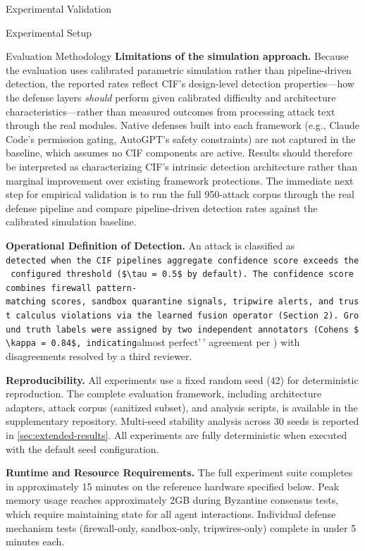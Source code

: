 \documentclass[
  ignorenonframetext,
]{beamer}
\begin{document}
\begin{frame}[fragile]{Experimental Validation}
\begin{block}{Experimental Setup}
\begin{block}{Evaluation Methodology}
\textbf{Limitations of the simulation approach.} Because the evaluation
uses calibrated parametric simulation rather than pipeline-driven
detection, the reported rates reflect CIF's design-level detection
properties---how the defense layers \emph{should} perform given
calibrated difficulty and architecture characteristics---rather than
measured outcomes from processing attack text through the real modules.
Native defenses built into each framework (e.g., Claude Code's
permission gating, AutoGPT's safety constraints) are not captured in the
baseline, which assumes no CIF components are active. Results should
therefore be interpreted as characterizing CIF's intrinsic detection
architecture rather than marginal improvement over existing framework
protections. The immediate next step for empirical validation is to run
the full 950-attack corpus through the real defense pipeline and compare
pipeline-driven detection rates against the calibrated simulation
baseline.

\textbf{Operational Definition of Detection.} An attack is classified as
\texttt{detected\textquotesingle{}\textquotesingle{}\ when\ the\ CIF\ pipeline\textquotesingle{}s\ aggregate\ confidence\ score\ exceeds\ the\ configured\ threshold\ (\$\textbackslash{}tau\ =\ 0.5\$\ by\ default).\ The\ confidence\ score\ combines\ firewall\ pattern-matching\ scores,\ sandbox\ quarantine\ signals,\ tripwire\ alerts,\ and\ trust\ calculus\ violations\ via\ the\ learned\ fusion\ operator\ (Section\ 2).\ Ground\ truth\ labels\ were\ assigned\ by\ two\ independent\ annotators\ (Cohen\textquotesingle{}s\ \$\textbackslash{}kappa\ =\ 0.84\$,\ indicating}almost
perfect'\,' agreement per \cite{landis1977measurement}) with
disagreements resolved by a third reviewer.

\textbf{Reproducibility.} All experiments use a fixed random seed (42)
for deterministic reproduction. The complete evaluation framework,
including architecture adapters, attack corpus (sanitized subset), and
analysis scripts, is available in the supplementary repository.
Multi-seed stability analysis across 30 seeds is reported in
\cref{sec:extended-results}. All experiments are fully deterministic
when executed with the default seed configuration.

\textbf{Runtime and Resource Requirements.} The full experiment suite
completes in approximately 15 minutes on the reference hardware
specified below. Peak memory usage reaches approximately 2GB during
Byzantine consensus tests, which require maintaining state for all agent
interactions. Individual defense mechanism tests (firewall-only,
sandbox-only, tripwires-only) complete in under 5 minutes each.


\end{block}
\end{block}
\end{frame}
\end{document}
